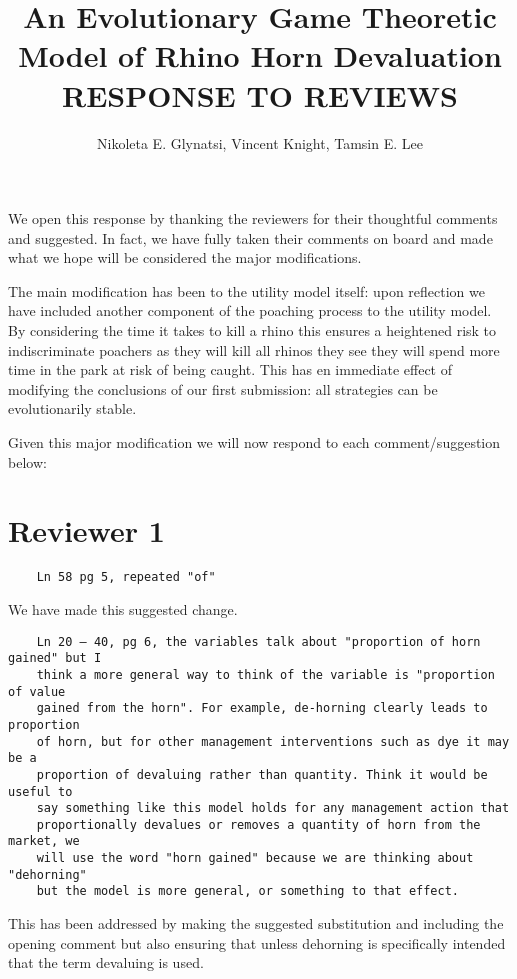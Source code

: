 \documentclass[10pt]{article}
\title{An Evolutionary Game Theoretic Model of Rhino Horn Devaluation RESPONSE
       TO REVIEWS}
\author{Nikoleta E. Glynatsi, Vincent Knight, Tamsin E. Lee}
\begin{document}
We open this response by thanking the reviewers for their thoughtful comments
and suggested. In fact, we have fully taken their comments on board and
made what we hope will be considered the major modifications.

The main modification has been to the utility model itself: upon reflection we
have included another component of the poaching process to the utility model. By
considering the time it takes to kill a rhino this ensures a heightened risk to
indiscriminate poachers as they will kill all rhinos they see they will spend
more time in the park at risk of being caught. This has en immediate effect of
modifying the conclusions of our first submission: all strategies can
be evolutionarily stable.

Given this major modification we will now respond to each comment/suggestion
below:


\section{Reviewer 1}

\begin{verbatim}
    Ln 58 pg 5, repeated "of"
\end{verbatim}

We have made this suggested change.

\begin{verbatim}
    Ln 20 – 40, pg 6, the variables talk about "proportion of horn gained" but I
    think a more general way to think of the variable is "proportion of value
    gained from the horn". For example, de-horning clearly leads to proportion
    of horn, but for other management interventions such as dye it may be a
    proportion of devaluing rather than quantity. Think it would be useful to
    say something like this model holds for any management action that
    proportionally devalues or removes a quantity of horn from the market, we
    will use the word "horn gained" because we are thinking about "dehorning"
    but the model is more general, or something to that effect.
\end{verbatim}

This has been addressed by making the suggested substitution and including the
opening comment but also ensuring
that unless dehorning is specifically intended that the term devaluing is used.
\end{document}
